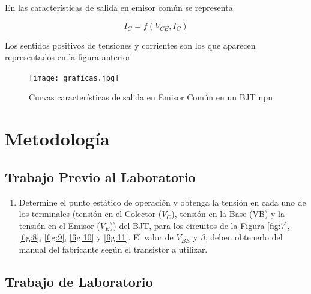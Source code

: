 \documentclass[10pt, a4paper]{article}
\begin{document}
    En las características de salida en emisor común se representa
    
    $$I_C = f(V_{CE}, I_C)$$

    Los sentidos positivos de tensiones y corrientes son los que aparecen representados en la figura anterior

    \begin{figure}[h!]
        \centering
        \texttt{[image: graficas.jpg]}
        \caption{\label{fig:6} Curvas características de salida en Emisor Común en un BJT npn}
    \end{figure}

    \newpage
    \newpage

    \section{Metodología}

    \subsection{Trabajo Previo al Laboratorio}

    \begin{enumerate}
        \item 	Determine el punto estático de operación y obtenga la tensión en cada uno de los terminales (tensión en el Colector ($V_C$), tensión en la Base (VB) y la tensión en el Emisor ($V_E$)) del BJT, para los circuitos de la Figura \ref{fig:7}, \ref{fig:8}, \ref{fig:9}, \ref{fig:10} y \ref{fig:11}. El valor de $V_{BE}$ y $\beta$, deben obtenerlo del manual del fabricante según el transistor a utilizar.
    \end{enumerate}

    \subsection{Trabajo de Laboratorio}
\end{document}
